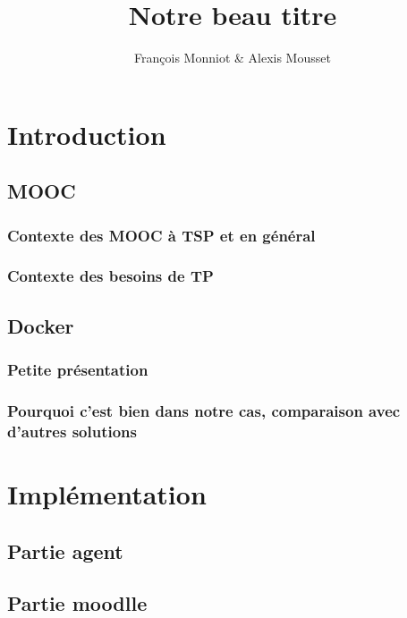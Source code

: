 \documentclass[a4paper,11pt]{report}
\title{Notre beau titre}
\author{François Monniot \& Alexis Mousset}
\begin{document}
\maketitle
\tableofcontents

\begin{abstract}

\end{abstract}

\chapter{Introduction}

\section{MOOC}

\subsection{Contexte des MOOC à TSP et en général}

\subsection{Contexte des besoins de TP}

\section{Docker}

\subsection{Petite présentation}

\subsection{Pourquoi c'est bien dans notre cas, comparaison avec d'autres solutions}

\chapter{Implémentation}

\section{Partie agent}

\section{Partie moodlle}
\end{document}

